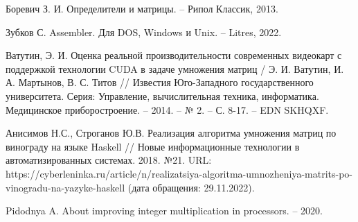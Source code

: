 \renewcommand{\bibname}{Список использованных источников}
\begin{thebibliography}{100}

Боревич З. И. Определители и матрицы. – Рипол Классик, 2013.

Зубков С. Assembler. Для DOS, Windows и Unix. – Litres, 2022.





Ватутин, Э. И. Оценка реальной производительности современных видеокарт с поддержкой технологии CUDA в задаче умножения матриц / Э. И. Ватутин, И. А. Мартынов, В. С. Титов // Известия Юго-Западного государственного университета. Серия: Управление, вычислительная техника, информатика. Медицинское приборостроение. – 2014. – № 2. – С. 8-17. – EDN SKHQXF.

Анисимов Н.С., Строганов Ю.В. Реализация алгоритма умножения матриц по винограду на языке Haskell // Новые информационные технологии в автоматизированных системах. 2018. №21. URL: https://cyberleninka.ru/article/n/realizatsiya-algoritma-umnozheniya-matrits-po-vinogradu-na-yazyke-haskell (дата обращения: 29.11.2022).

Pidodnya A. About improving integer multiplication in processors. – 2020.



\end{thebibliography}

\newpage